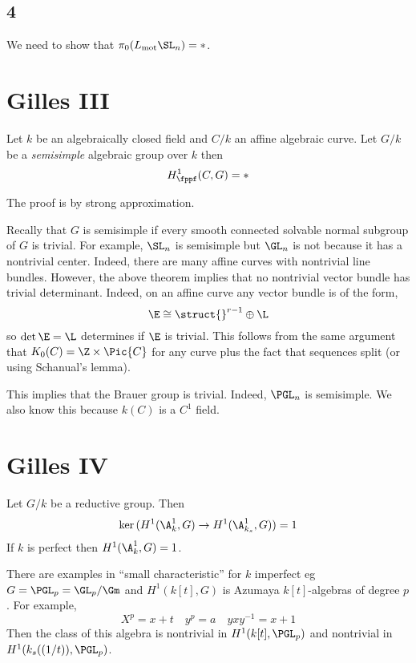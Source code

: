 \documentclass{article}
\begin{document}
\subsection{4}

We need to show that $\pi_0(L_{\mot} \SL_n) = *$. 

\section{Gilles III}

\begin{theorem}
Let $k$ be an algebraically closed field and $C/k$ an affine algebraic curve. Let $G/k$ be a \textit{semisimple} algebraic group over $k$ then
\[ H^1_{\fppf}(C, G) = * \]
\end{theorem}

The proof is by strong approximation.

\begin{rmk}
Recally that $G$ is semisimple if every smooth connected solvable normal subgroup of $G$ is trivial. For example, $\SL_n$ is semisimple but $\GL_n$ is not because it has a nontrivial center. Indeed, there are many affine curves with nontrivial line bundles. However, the above theorem implies that no nontrivial vector bundle has trivial determinant. Indeed, on an affine curve any vector bundle is of the form,
\[ \E \cong \struct{}^{r - 1} \oplus \L \]
so $\det{\E} = \L$ determines if $\E$ is trivial. This follows from the same argument that $K_0(C) = \Z \times \Pic{C}$ for any curve plus the fact that sequences split (or using Schanual's lemma).
\end{rmk}

\begin{example}
This implies that the Brauer group is trivial. Indeed, $\PGL_n$ is semisimple. We also know this because $k(C)$ is a $C^1$ field. 
\end{example}

\section{Gilles IV}

\begin{theorem}
Let $G/k$ be a reductive group. Then
\[ \ker{(H^1(\A^1_k, G) \to H^1(\A_{k_s}^1, G))} = 1 \]
If $k$ is perfect then $H^1(\A^1_k, G) = 1$.
\end{theorem}

There are examples in ``small characteristic'' for $k$ imperfect eg $G = \PGL_p = \GL_p / \Gm$ and $H^1(k[t], G)$ is Azumaya $k[t]$-algebras of degree $p$. For example,
\[ X^p = x + t \quad y^p = a \quad y x y^{-1} = x + 1 \]
Then the class of this algebra is nontrivial in $H^1(k[t], \PGL_p)$ and nontrivial in $H^1(k_s((1/t)), \PGL_p)$. 
\end{document}
